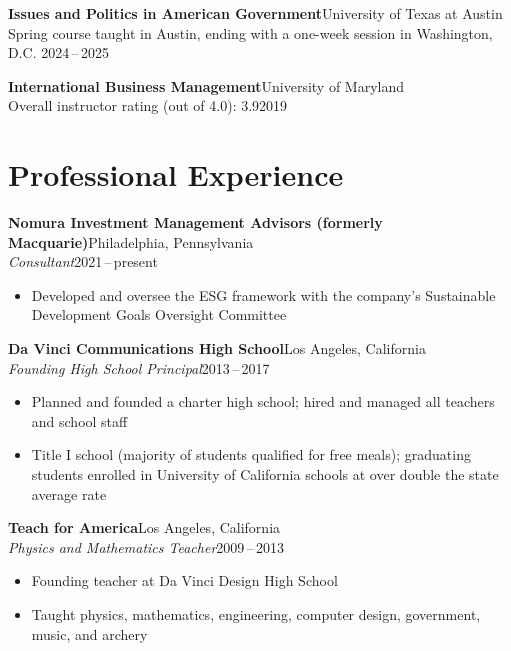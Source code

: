 \documentclass[11pt]{article}
\newcommand{\job}[4]{\needspace{5\baselineskip}\textbf{#1}\hfill #2\\\textit{#3}\hfill #4\par}
\begin{document}
\textbf{Issues and Politics in American Government}\hfill University of Texas at Austin\\
Spring course taught in Austin, ending with a one-week session in Washington, D.C.\hfill
2024\,--\,2025\par\vspace{7pt}

\textbf{International Business Management}\hfill University of Maryland\\
Overall instructor rating (out of 4.0): 3.9\hfill 2019\par

\newpage
\section*{Professional Experience}

\job{Nomura Investment Management Advisors (formerly Macquarie)}{Philadelphia, Pennsylvania}
    {Consultant}{2021\,--\,present}
\begin{itemize}
  \item Developed and oversee the ESG framework with the company's Sustainable Development Goals
        Oversight Committee
\end{itemize}
\vspace{7pt}

\job{Da Vinci Communications High School}{Los Angeles, California}
    {Founding High School Principal}{2013\,--\,2017}
\begin{itemize}
  \item Planned and founded a charter high school; hired and managed all teachers and school staff
  \item Title I school (majority of students qualified for free meals); graduating students enrolled
        in University of California schools at over double the state average rate
\end{itemize}
\vspace{7pt}

\job{Teach for America}{Los Angeles, California}
    {Physics and Mathematics Teacher}{2009\,--\,2013}
\begin{itemize}
  \item Founding teacher at Da Vinci Design High School
  \item Taught physics, mathematics, engineering, computer design, government, music, and archery
\end{itemize}
\vspace{7pt}
\end{document}
